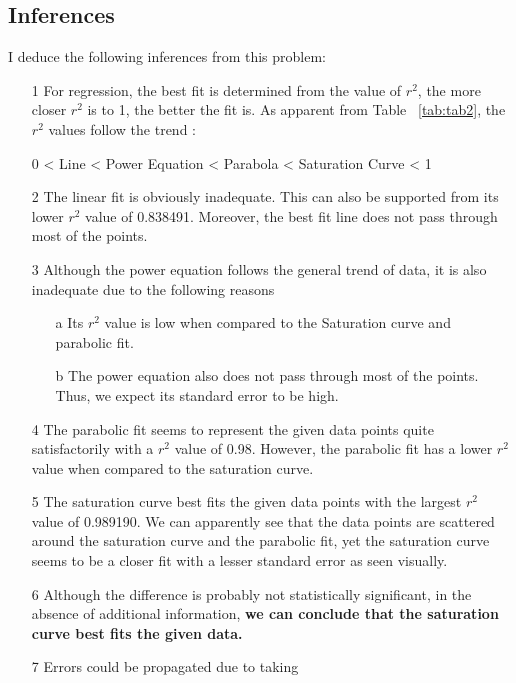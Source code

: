 \documentclass[titlepage, 11pt]{article}
\begin{document}

\subsection{Inferences}
I deduce the following inferences from this problem:
\begin{itemize}
    \item [1] For regression, the best fit is determined from the value of $r^2$, the more closer $r^2$ is to 1, the better the fit is. As apparent from Table ~\ref{tab:tab2}, the $r^2$ values follow the trend :\\
    \begin{center}
        0 < Line < Power Equation < Parabola < Saturation Curve < 1
    \end{center}
    \item [2] The linear fit is obviously inadequate. This can also be supported from its lower $r^2$ value of 0.838491. Moreover, the best fit line does not pass through most of the points. 
    \item [3] Although the power equation follows the general trend of data, it is also inadequate due to the following reasons 
    \begin{itemize}
        \item [a] Its $r^2$ value is low when compared to the Saturation curve and parabolic fit.
        \item [b] The power equation also does not pass through most of the points. Thus, we expect its standard error to be high.
     \end{itemize}
     \item [4] The parabolic fit seems to represent the given data points quite satisfactorily with a $r^2$ value of 0.98. However, the parabolic fit has a lower $r^2$ value when compared to the saturation curve. 
     \item [5] The saturation curve best fits the given data points with the largest $r^2$ value of 0.989190. We can apparently see that the data points are scattered around the saturation curve and the parabolic fit, yet the saturation curve seems to be a closer fit with a lesser standard error as seen visually. 
     \item [6] Although the difference is probably not statistically significant, in the absence of additional information, \textbf{we can conclude that the saturation curve best fits the given data. }
     \item [7] Errors could be propagated due to taking 

\end{itemize}
\end{document}
